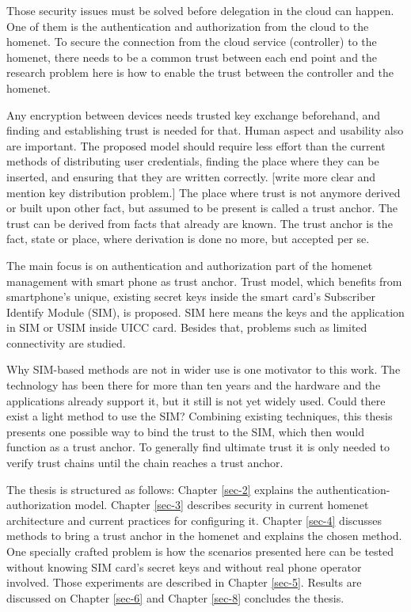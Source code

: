 \documentclass[12pt,a4paper,english]{tutthesis}
\begin{document}
Those security issues must be solved before delegation in the cloud can
happen. One of them is the authentication and authorization 
from the cloud to the homenet.
To secure the connection from the cloud service (controller)
to the homenet, there needs to be a common trust between each end
point and the research problem here is how to enable the trust between the
controller and the homenet.  

Any encryption between devices needs trusted key exchange
beforehand, and finding and establishing trust is needed for that.
Human aspect and usability also are important. The proposed model should
require less effort than the current methods of distributing user
credentials, finding the place where they can be inserted, and
ensuring that they are written correctly. 
[write more clear and mention key distribution problem.]
The place where trust is not anymore derived or built upon other 
fact, but assumed to be present is called a trust anchor.
The trust can be derived from facts that already are known.
The trust anchor is the fact, state or place, where derivation is
done no more, but accepted per se.


The main focus is on authentication and authorization part of
the homenet management with smart phone as trust anchor.
Trust model, which benefits from smartphone's unique,
existing secret keys inside the smart card's  Subscriber Identify Module
(SIM), is proposed. 
SIM here means the keys and the application in SIM or USIM inside UICC card. 
Besides that, problems such as limited connectivity are studied. 


Why SIM-based methods are not in wider use is one motivator to this
work.  The technology has been there for more than ten years and
the hardware and the applications already support it, but it still is not yet
widely used.  Could there exist a light method to use the SIM?  Combining
existing techniques, this thesis presents one possible way to bind the
trust to the SIM, which then would function as a trust anchor. To
generally find ultimate trust it is only needed to verify trust chains
until the chain reaches a trust anchor.




The thesis is structured as follows: Chapter \ref{sec-2} explains the authentication-authorization model.
Chapter \ref{sec-3} describes security in current homenet architecture and 
current practices for configuring it.
 Chapter \ref{sec-4}
discusses methods to bring a trust anchor in the homenet and explains
the chosen method.
One specially crafted problem is how the scenarios presented here can be
tested without knowing SIM card's secret keys and without real phone
operator involved.  Those experiments are described in Chapter
\ref{sec-5}.
Results are discussed on Chapter \ref{sec-6} and Chapter \ref{sec-8} concludes the
thesis.
\end{document}
